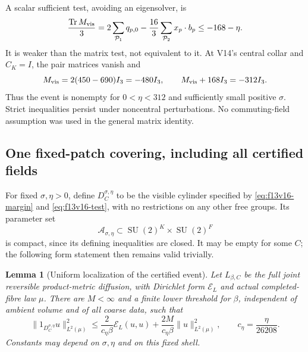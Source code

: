\documentclass[11pt,oneside]{article}
\newtheorem{lemma}[theorem]{Lemma}
\DeclareMathOperator{\SU}{SU}
\begin{document}
A scalar sufficient test, avoiding an eigensolver, is
\[
 \frac{\operatorname{Tr}M_{\rm vis}}3
 =2\sum_{\mathcal P_1}q_{p,0}
       -\frac{16}{3}\sum_{\mathcal P_2}x_p\cdot b_p
                         \le-168-\eta.
\]
It is weaker than the matrix test, not equivalent to it.
At V14's central collar and \(C_K=I\), the pair
matrices vanish and
\[
 M_{\rm vis}=2(450-690)I_3=-480I_3,\qquad
                       M_{\rm vis}+168I_3=-312I_3.
\]
Thus the event is nonempty for \(0<\eta<312\)
and sufficiently small positive \(\sigma\).
Strict inequalities persist under noncentral
perturbations. No commuting-field assumption
was used in the general matrix identity.

\subsection{One fixed-patch covering, including all certified fields}

For fixed \(\sigma,\eta>0\), define \(D_C^{\sigma,\eta}\)
to be the visible cylinder specified by
\eqref{eq:f13v16-margin} and \eqref{eq:f13v16-test},
with no restrictions on any other free groups.
Its parameter set
\[
 \mathcal A_{\sigma,\eta}\subset
                     \SU(2)^K\times\SU(2)^F
\]
is compact, since its defining inequalities are closed.
It may be empty for some \(C\); the following
form statement then remains valid trivially.

\begin{lemma}[Uniform localization of the certified event]
\label{lem:f13v16-localize}
Let \(L_{\beta,C}\) be the full joint reversible
product-metric diffusion, with Dirichlet form
\(\mathcal E_L\) and actual completed-fibre law \(\mu\).
There are \(M<\infty\) and a finite lower threshold
for \(\beta\), independent of ambient volume and
of all coarse data, such that
\begin{equation}\label{eq:f13v16-localize}
 \|1_{D_C^{\sigma,\eta}}u\|_{L^2(\mu)}^2
 \le\frac{2}{c_\eta\beta}\mathcal E_L(u,u)
             +\frac{2M}{c_\eta\beta}\|u\|_{L^2(\mu)}^2,
             \qquad c_\eta=\frac{\eta}{26208}.
\end{equation}
Constants may depend on \(\sigma,\eta\) and on this
fixed shell.
\end{lemma}
\end{document}
